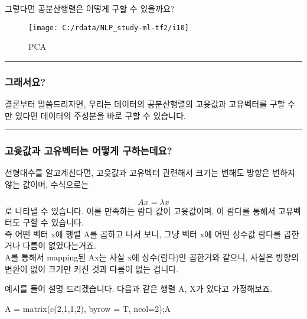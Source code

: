 \documentclass[
]{article}
\newenvironment{Shaded}{\begin{snugshade}}{\end{snugshade}}
\newcommand{\AttributeTok}[1]{\textcolor[rgb]{0.77,0.63,0.00}{#1}}
\newcommand{\DecValTok}[1]{\textcolor[rgb]{0.00,0.00,0.81}{#1}}
\newcommand{\FunctionTok}[1]{\textcolor[rgb]{0.00,0.00,0.00}{#1}}
\newcommand{\NormalTok}[1]{#1}
\newcommand{\OtherTok}[1]{\textcolor[rgb]{0.56,0.35,0.01}{#1}}
\begin{document}
그렇다면 공분산행렬은 어떻게 구할 수 있을까요?

\begin{figure}

{\centering \texttt{[image: C:/rdata/NLP\_study-ml-tf2/i10]} 

}

\caption{PCA}\label{fig:unnamed-chunk-5}
\end{figure}

\begin{center}\rule{0.5\linewidth}{0.5pt}\end{center}

\hypertarget{uxadf8uxb798uxc11cuxc694}{%
\subsubsection{그래서요?}\label{uxadf8uxb798uxc11cuxc694}}

결론부터 말씀드리자면, 우리는 데이터의 공분산행렬의 고윳값과 고유벡터를
구할 수만 있다면 데이터의 주성분을 바로 구할 수 있습니다.

\begin{center}\rule{0.5\linewidth}{0.5pt}\end{center}

\hypertarget{uxace0uxc733uxac12uxacfc-uxace0uxc720uxbca1uxd130uxb294-uxc5b4uxb5bbuxac8c-uxad6cuxd558uxb294uxb370uxc694}{%
\subsubsection{고윳값과 고유벡터는 어떻게
구하는데요?}\label{uxace0uxc733uxac12uxacfc-uxace0uxc720uxbca1uxd130uxb294-uxc5b4uxb5bbuxac8c-uxad6cuxd558uxb294uxb370uxc694}}

선형대수를 알고계신다면, 고윳값과 고유벡터 관련해서 크기는 변해도 방향은
변하지 않는 값이며, 수식으로는

\[
Ax = \lambda x
\] 로 나타낼 수 있습니다. 이를 만족하는 람다 값이 고윳값이며, 이 람다를
통해서 고유벡터도 구할 수 있습니다.\\
즉 어떤 벡터 x에 행렬 A를 곱하고 나서 보니, 그냥 벡터 x에 어떤 상수값
람다를 곱한거나 다름이 없었다는거죠.\\
A를 통해서 mapping된 Ax는 사실 x에 상수(람다)만 곱한거와 같으니, 사실은
방향의 변환이 없이 크기만 커진 것과 다름이 없는 겁니다.

예시를 들어 설명 드리겠습니다. 다음과 같은 행렬 A, X가 있다고
가정해보죠.

\begin{Shaded}
\begin{Highlighting}[]
\NormalTok{A }\OtherTok{=} \FunctionTok{matrix}\NormalTok{(}\FunctionTok{c}\NormalTok{(}\DecValTok{2}\NormalTok{,}\DecValTok{1}\NormalTok{,}\DecValTok{1}\NormalTok{,}\DecValTok{2}\NormalTok{), }\AttributeTok{byrow =}\NormalTok{ T, }\AttributeTok{ncol=}\DecValTok{2}\NormalTok{);A}
\end{Highlighting}
\end{Shaded}
\end{document}
